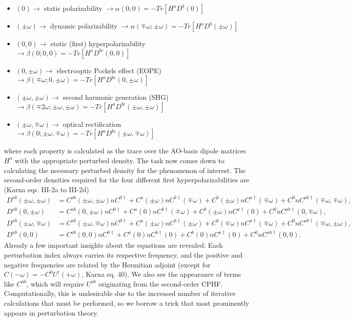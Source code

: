 \begin{itemize}
\item \((0) \rightarrow\) static polarizability \(\rightarrow \alpha(0;0) = -Tr[H^{a} D^{b}(0)]\)
\item \((\pm\omega) \rightarrow\) dynamic polarizability \(\rightarrow \alpha(\mp\omega;\pm\omega) = -Tr[H^{a} D^{b}(\pm\omega)]\)
\item \((0,0) \rightarrow\) static (first) hyperpolarizability \(\rightarrow \beta(0;0,0) = -Tr[H^{a} D^{bc}(0,0)]\)
\item \((0,\pm\omega) \rightarrow\) electrooptic Pockels effect (EOPE) \(\rightarrow \beta(\mp \omega;0,\pm\omega) = -Tr[H^{a} D^{bc}(0,\pm\omega)]\)
\item \((\pm\omega,\pm\omega) \rightarrow\) second harmonic generation (SHG) \(\rightarrow \beta(\mp 2\omega;\pm\omega,\pm\omega) = -Tr[H^{a} D^{bc}(\pm\omega,\pm\omega)]\)
\item \((\pm\omega,\mp\omega) \rightarrow\) optical rectification \(\rightarrow \beta(0;\pm\omega,\mp\omega) = -Tr[H^{a} D^{bc}(\pm\omega,\mp\omega)]\)
\end{itemize}
where each property is calculated as the trace over the AO-basis dipole matrices \(H^{a}\) with the appropriate perturbed density. The task now comes down to calculating the necessary perturbed density for the phenomenon of interest. The second-order densities required for the four different first hyperpolarizabilities are (Karna eqs. III-2a to III-2d)
\begin{align}
D^{ab}(\pm\omega,\pm\omega) &= C^{ab}(\pm\omega,\pm\omega) n C^{0\dagger} + C^{a}(\pm\omega) n C^{b\dagger}(\mp\omega) + C^{b}(\pm\omega) n C^{a\dagger}(\mp\omega) + C^{0} n C^{ab\dagger}(\mp\omega,\mp\omega), \\
D^{ab}(0,\pm\omega) &= C^{ab}(0,\pm\omega) n C^{0\dagger} + C^{a}(0) n C^{b\dagger}(\mp\omega) + C^{b}(\pm\omega) n C^{a\dagger}(0) + C^{0} n C^{ab\dagger}(0,\mp\omega), \\
D^{ab}(\pm\omega,\mp\omega) &= C^{ab}(\pm\omega,\mp\omega) n C^{0\dagger} + C^{a}(\pm\omega) n C^{b\dagger}(\pm\omega) + C^{b}(\mp\omega) n C^{a\dagger}(\mp\omega) + C^{0} n C^{ab\dagger}(\mp\omega,\pm\omega), \\
D^{ab}(0,0) &= C^{ab}(0,0) n C^{0\dagger} + C^{a}(0) n C^{b\dagger}(0) + C^{b}(0) n C^{a\dagger}(0) + C^{0} n C^{ab\dagger}(0,0).
\end{align}
Already a few important insights about the equations are revealed: Each perturbation index always carries its respective frequency, and the positive and negative frequencies are related by the Hermitian adjoint (except for \(C(-\omega) = -C^{0} U^{\dagger}(+\omega)\), Karna eq. 40).  We also see the appearance of terms like \(C^{ab}\), which will require \(U^{ab}\) originating from the second-order CPHF. Computationally, this is undesirable due to the increased number of iterative calculations that must be performed, so we borrow a trick that most prominently appears in perturbation theory.

